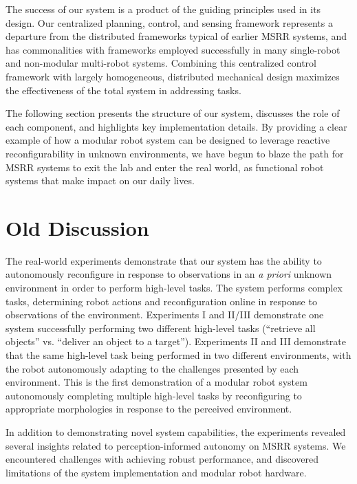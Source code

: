 \documentclass[12pt]{article}
\begin{document}
The success of our system is a product of the guiding principles used in its design.  Our centralized planning, control, and sensing framework represents a departure from the distributed frameworks typical of earlier MSRR systems, and has commonalities with frameworks employed successfully in many single-robot and non-modular multi-robot systems.  Combining this centralized control framework with largely homogeneous, distributed mechanical design maximizes the effectiveness of the total system in addressing tasks.

The following section presents the structure of our system, discusses the role of each component, and highlights key implementation details.  By providing a clear example of how a modular robot system can be designed to leverage reactive reconfigurability in unknown environments, we have begun to blaze the path for MSRR systems to exit the lab and enter the real world, as functional robot systems that make impact on our daily lives.

\section{Old Discussion}
\label{sec:old-discussion}
The real-world experiments demonstrate that our system has the ability to autonomously reconfigure in response to observations in an \textit{a priori} unknown environment in order to perform high-level tasks. The system performs complex tasks, determining robot actions and reconfiguration online in response to observations of the environment. Experiments I and II/III demonstrate one system successfully performing two different high-level tasks (``retrieve all objects'' vs. ``deliver an object to a target''). Experiments II and III demonstrate that the same high-level task being performed in two different environments, with the robot autonomously adapting to the challenges presented by each environment. This is the first demonstration of a modular robot system autonomously completing multiple high-level tasks by reconfiguring to appropriate morphologies in response to the perceived environment.

In addition to demonstrating novel system capabilities, the experiments revealed several insights related to perception-informed autonomy on MSRR systems. We encountered challenges with achieving robust performance, and discovered limitations of the system implementation and modular robot hardware. %
%
\end{document}

